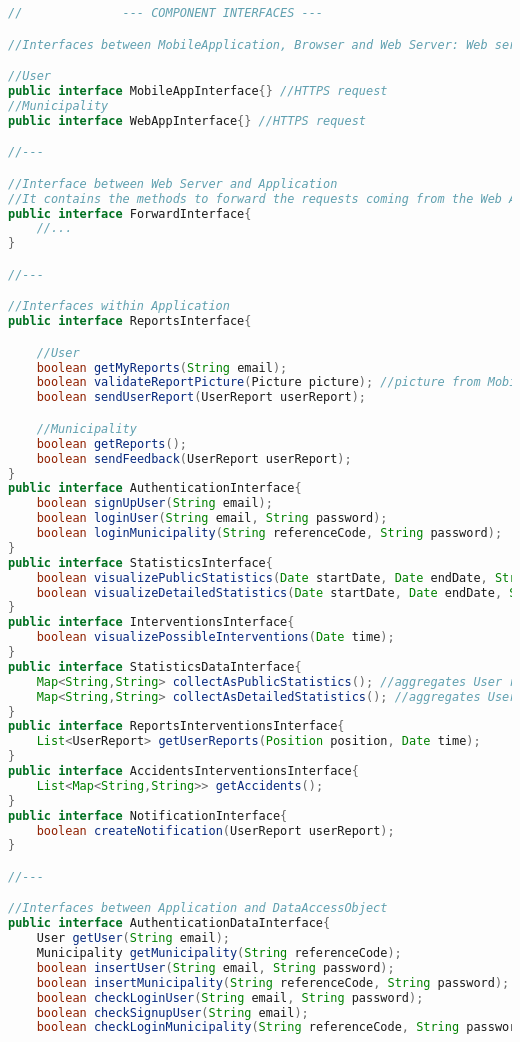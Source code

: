 \documentclass[../../DD.tex]{subfiles}
\begin{document}
\begin{lstlisting}[language=Java]
//				--- COMPONENT INTERFACES ---

//Interfaces between MobileApplication, Browser and Web Server: Web server manages the HTTPS communications with MobileApplication and Browser

//User
public interface MobileAppInterface{} //HTTPS request
//Municipality
public interface WebAppInterface{} //HTTPS request

//---

//Interface between Web Server and Application
//It contains the methods to forward the requests coming from the Web Application to the Router in the Application
public interface ForwardInterface{
	//...
}

//---

//Interfaces within Application
public interface ReportsInterface{

	//User
	boolean getMyReports(String email);
	boolean validateReportPicture(Picture picture); //picture from Mobile Application
	boolean sendUserReport(UserReport userReport);

	//Municipality
	boolean getReports();
	boolean sendFeedback(UserReport userReport);
}
public interface AuthenticationInterface{
	boolean signUpUser(String email);
	boolean loginUser(String email, String password);
	boolean loginMunicipality(String referenceCode, String password);
}
public interface StatisticsInterface{
	boolean visualizePublicStatistics(Date startDate, Date endDate, String typeOfViolation, Position position);
	boolean visualizeDetailedStatistics(Date startDate, Date endDate, String typeOfViolation, Position position, String licensePlateNumber);
}
public interface InterventionsInterface{
	boolean visualizePossibleInterventions(Date time);
}
public interface StatisticsDataInterface{
	Map<String,String> collectAsPublicStatistics(); //aggregates User reports data
	Map<String,String> collectAsDetailedStatistics(); //aggregates User reports data
}
public interface ReportsInterventionsInterface{
	List<UserReport> getUserReports(Position position, Date time);
}
public interface AccidentsInterventionsInterface{
	List<Map<String,String>> getAccidents();
}
public interface NotificationInterface{
	boolean createNotification(UserReport userReport);
}

//---

//Interfaces between Application and DataAccessObject
public interface AuthenticationDataInterface{
	User getUser(String email);
	Municipality getMunicipality(String referenceCode);
	boolean insertUser(String email, String password);
	boolean insertMunicipality(String referenceCode, String password);
	boolean checkLoginUser(String email, String password);
	boolean checkSignupUser(String email);
	boolean checkLoginMunicipality(String referenceCode, String password);


\end{lstlisting}
\end{document}
